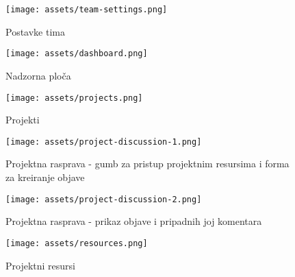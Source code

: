 \begin{figure}[H]
	\texttt{[image: assets/team-settings.png]}
	\centering
	\caption{Postavke tima}
	\label{fig:teamSettings}
\end{figure}

\begin{figure}[H]
	\texttt{[image: assets/dashboard.png]}
	\centering
	\caption{Nadzorna ploča}
	\label{fig:dashboard}
\end{figure}

\begin{figure}[H]
	\texttt{[image: assets/projects.png]}
	\centering
	\caption{Projekti}
	\label{fig:projects}
\end{figure}

\begin{figure}[H]
	\texttt{[image: assets/project-discussion-1.png]}
	\centering
	\caption{Projektna rasprava - gumb za pristup projektnim resursima i forma za kreiranje objave}
	\label{fig:projectDiscussion1}
\end{figure}

\begin{figure}[H]
	\texttt{[image: assets/project-discussion-2.png]}
	\centering
	\caption{Projektna rasprava - prikaz objave i pripadnih joj komentara}
	\label{fig:projectDiscussion2}
\end{figure}

\begin{figure}[H]
	\texttt{[image: assets/resources.png]}
	\centering
	\caption{Projektni resursi}
	\label{fig:resources}
\end{figure}
